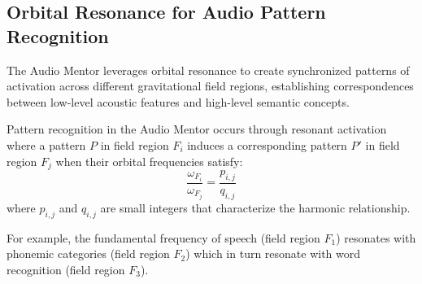 \subsection{Orbital Resonance for Audio Pattern Recognition}

The Audio Mentor leverages orbital resonance to create synchronized patterns of activation across different gravitational field regions, establishing correspondences between low-level acoustic features and high-level semantic concepts.

\begin{theorem}
Pattern recognition in the Audio Mentor occurs through resonant activation where a pattern $P$ in field region $F_i$ induces a corresponding pattern $P'$ in field region $F_j$ when their orbital frequencies satisfy:
\begin{equation}
\frac{\omega_{F_i}}{\omega_{F_j}} = \frac{p_{i,j}}{q_{i,j}}
\end{equation}
where $p_{i,j}$ and $q_{i,j}$ are small integers that characterize the harmonic relationship.
\end{theorem}

For example, the fundamental frequency of speech (field region $F_1$) resonates with phonemic categories (field region $F_2$) which in turn resonate with word recognition (field region $F_3$).

